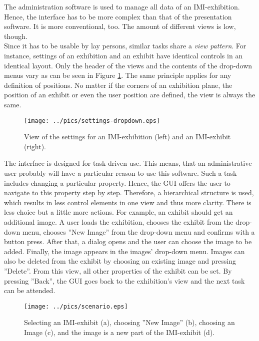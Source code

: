 The administration software is used to manage all data of an \ac{IMI}-exhibition. Hence, the interface has to be more complex than that of the presentation software. It is more conventional, too. The amount of different views is low, though. 
\\
Since it has to be usable by lay persons, similar tasks share a \textit{view pattern}. For instance, settings of an exhibition and an exhibit have identical controls in an identical layout. Only the header of the views and the contents of the drop-down menus vary as can be seen in Figure \ref{fig:ui_admin_settings}. The same principle applies for any definition of positions. No matter if the corners of an exhibition plane, the position of an exhibit or even the user position are defined, the view is always the same.
\begin{figure}[H]%
\texttt{[image: ../pics/settings-dropdown.eps]}%
\caption{View of the settings for an \ac{IMI}-exhibition (left) and an \ac{IMI}-exhibit (right).}%
\label{fig:ui_admin_settings}%
\end{figure}

The interface is designed for task-driven use. This means, that an administrative user probably will have a particular reason to use this software. Such a task includes changing a particular property. Hence, the \ac{GUI} offers the user to navigate to this property step by step. Therefore, a hierarchical structure is used, which results in less control elements in one view and thus more clarity. There is less choice but a little more actions. For example, an exhibit should get an additional image. A user loads the exhibition, chooses the exhibit from the drop-down menu, chooses ''New Image'' from the drop-down menu and confirms with a button press. After that, a dialog opens and the user can choose the image to be added. Finally, the image appears in the images' drop-down menu. Images can also be deleted from the exhibit by choosing an existing image and pressing ''Delete''. From this view, all other properties of the exhibit can be set. By pressing ''Back'', the \ac{GUI} goes back to the exhibition's view and the next task can be attended.
\begin{figure}[H]%
\texttt{[image: ../pics/scenario.eps]}%
\caption{Selecting an \ac{IMI}-exhibit (a), choosing ''New Image'' (b), choosing an Image (c), and the image is a new part of the \ac{IMI}-exhibit (d).}%
\label{fig:ui_admin_scenario}%
\end{figure}

